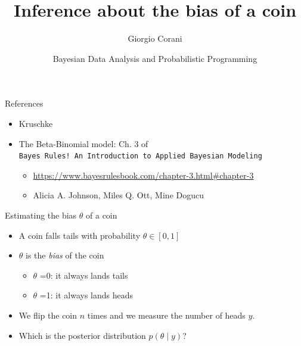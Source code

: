 \documentclass[
  13pt,
  ignorenonframetext,
]{beamer}
\title{Inference about the bias of a coin}
\author{Giorgio Corani}
\date{Bayesian Data Analysis and Probabilistic Programming}
\providecommand{\tightlist}{%
  \setlength{\itemsep}{0pt}\setlength{\parskip}{0pt}}
\begin{document}
\frame{\titlepage}

\begin{frame}[fragile]{References}
\protect\hypertarget{references}{}
\begin{itemize}
\tightlist
\item
  Kruschke
\item
  The Beta-Binomial model: Ch. 3 of
  \texttt{Bayes\ Rules!\ An\ Introduction\ to\ Applied\ Bayesian\ Modeling}

  \begin{itemize}
  \tightlist
  \item
    \url{https://www.bayesrulesbook.com/chapter-3.html\#chapter-3}
  \item
    Alicia A. Johnson, Miles Q. Ott, Mine Dogucu
  \end{itemize}
\end{itemize}
\end{frame}

\begin{frame}{Estimating the bias \(\theta\) of a coin}
\protect\hypertarget{estimating-the-bias-theta-of-a-coin}{}
\begin{itemize}
\tightlist
\item
  A coin falls tails with probability \(\theta \in [0,1]\)
\item
  \(\theta\) is the \emph{bias} of the coin

  \begin{itemize}
  \tightlist
  \item
    \(\theta\) =0: it always lands tails
  \item
    \(\theta\) =1: it always lands heads
  \end{itemize}
\item
  We flip the coin \(n\) times and we measure the number of heads \(y\).
\item
  Which is the posterior distribution \(p(\theta \mid y)\)?
\end{itemize}
\end{frame}
\end{document}
